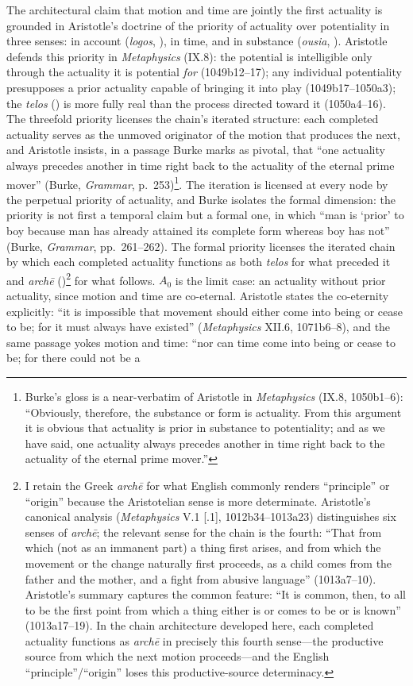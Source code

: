 The architectural claim that motion and time are jointly the first actuality is grounded in Aristotle's doctrine of the priority of actuality over potentiality in three senses: in account (\textit{logos}, ), in time, and in substance (\textit{ousia}, ). Aristotle defends this priority in \textit{Metaphysics} (IX.8): the potential is intelligible only through the actuality it is potential \textit{for} (1049b12--17); any individual potentiality presupposes a prior actuality capable of bringing it into play (1049b17--1050a3); the \textit{telos} () is more fully real than the process directed toward it (1050a4--16). The threefold priority licenses the chain's iterated structure: each completed actuality serves as the unmoved originator of the motion that produces the next, and Aristotle insists, in a passage Burke marks as pivotal, that ``one actuality always precedes another in time right back to the actuality of the eternal prime mover'' (Burke, \textit{Grammar}, p.~253)\footnote{Burke's gloss is a near-verbatim of Aristotle in \textit{Metaphysics} (IX.8, 1050b1--6): ``Obviously, therefore, the substance or form is actuality. From this argument it is obvious that actuality is prior in substance to potentiality; and as we have said, one actuality always precedes another in time right back to the actuality of the eternal prime mover.''}. The iteration is licensed at every node by the perpetual priority of actuality, and Burke isolates the formal dimension: the priority is not first a temporal claim but a formal one, in which ``man is `prior' to boy because man has already attained its complete form whereas boy has not'' (Burke, \textit{Grammar}, pp.~261--262). The formal priority licenses the iterated chain by which each completed actuality functions as both \textit{telos} for what preceded it and \textit{archē} ()\footnote{I retain the Greek \textit{archē} for what English commonly renders ``principle'' or ``origin'' because the Aristotelian sense is more determinate. Aristotle's canonical analysis (\textit{Metaphysics} V.1 [.1], 1012b34--1013a23) distinguishes six senses of \textit{archē}; the relevant sense for the chain is the fourth: ``That from which (not as an immanent part) a thing first arises, and from which the movement or the change naturally first proceeds, as a child comes from the father and the mother, and a fight from abusive language'' (1013a7--10). Aristotle's summary captures the common feature: ``It is common, then, to all to be the first point from which a thing either is or comes to be or is known'' (1013a17--19). In the chain architecture developed here, each completed actuality functions as \textit{archē} in precisely this fourth sense---the productive source from which the next motion proceeds---and the English ``principle''/``origin'' loses this productive-source determinacy.} for what follows. $A_0$ is the limit case: an actuality without prior actuality, since motion and time are co-eternal. Aristotle states the co-eternity explicitly: ``it is impossible that movement should either come into being or cease to be; for it must always have existed'' (\textit{Metaphysics} XII.6, 1071b6--8), and the same passage yokes motion and time: ``nor can time come into being or cease to be; for there could not be a 
